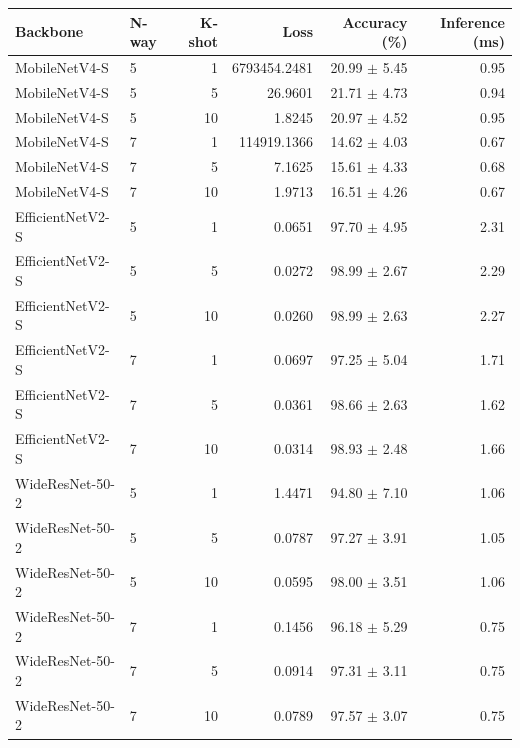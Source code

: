 \begin{tabular}{llrrrr}
Backbone & N-way & K-shot & Loss & Accuracy (\%) & Inference (ms) \\ \hline
MobileNetV4-S & 5 & 1 & 6793454.2481 & 20.99 $\pm$ 5.45 & 0.95 \\
MobileNetV4-S & 5 & 5 & 26.9601 & 21.71 $\pm$ 4.73 & 0.94 \\
MobileNetV4-S & 5 & 10 & 1.8245 & 20.97 $\pm$ 4.52 & 0.95 \\
MobileNetV4-S & 7 & 1 & 114919.1366 & 14.62 $\pm$ 4.03 & 0.67 \\
MobileNetV4-S & 7 & 5 & 7.1625 & 15.61 $\pm$ 4.33 & 0.68 \\
MobileNetV4-S & 7 & 10 & 1.9713 & 16.51 $\pm$ 4.26 & 0.67 \\
EfficientNetV2-S & 5 & 1 & 0.0651 & 97.70 $\pm$ 4.95 & 2.31 \\
EfficientNetV2-S & 5 & 5 & 0.0272 & 98.99 $\pm$ 2.67 & 2.29 \\
EfficientNetV2-S & 5 & 10 & 0.0260 & 98.99 $\pm$ 2.63 & 2.27 \\
EfficientNetV2-S & 7 & 1 & 0.0697 & 97.25 $\pm$ 5.04 & 1.71 \\
EfficientNetV2-S & 7 & 5 & 0.0361 & 98.66 $\pm$ 2.63 & 1.62 \\
EfficientNetV2-S & 7 & 10 & 0.0314 & 98.93 $\pm$ 2.48 & 1.66 \\
WideResNet-50-2 & 5 & 1 & 1.4471 & 94.80 $\pm$ 7.10 & 1.06 \\
WideResNet-50-2 & 5 & 5 & 0.0787 & 97.27 $\pm$ 3.91 & 1.05 \\
WideResNet-50-2 & 5 & 10 & 0.0595 & 98.00 $\pm$ 3.51 & 1.06 \\
WideResNet-50-2 & 7 & 1 & 0.1456 & 96.18 $\pm$ 5.29 & 0.75 \\
WideResNet-50-2 & 7 & 5 & 0.0914 & 97.31 $\pm$ 3.11 & 0.75 \\
WideResNet-50-2 & 7 & 10 & 0.0789 & 97.57 $\pm$ 3.07 & 0.75 \\
\end{tabular}

